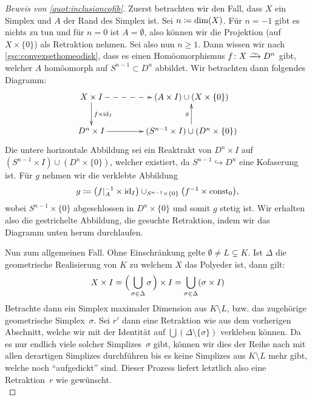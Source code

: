 \begin{proof}[Beweis von \cref{quot:inclusioncofib}]
    \pagebreak[2]
    Zuerst betrachten wir den Fall, dass $X$ ein Simplex und $A$ der Rand
    des Simplex ist. Sei $n\coloneqq\dim(X)$. Für $n=-1$ gibt es nichts zu tun und
    für $n=0$ ist $A=\emptyset$, also können wir die Projektion (auf
    $X\times\{0\}$) als Retraktion nehmen. Sei also nun $n\geq1$.
    Dann wissen wir nach \cref{gsc:convexsethomeodisk}, dass es
    einen Homöomorphismus 
    $f\colon X\xrightarrow{\smash{\raisebox{-2pt}{$\sim$}}} D^n$ 
    gibt, welcher $A$ homöomorph auf $S^{n-1}\subset D^n$ abbildet.
    Wir betrachten dann folgendes Diagramm:
    \begin{equation*}
        \begin{xy}
            \xymatrix@C=1.5cm{
                X\times I \ar@{-->}[r] \ar[d]^{f\times\id_I}
                & (A\times I)\cup(X\times\{0\})    
                \\
                D^n\times I \ar[r] 
                & (S^{n-1}\times I)\cup(D^n\times\{0\}) \ar[u]^g
            }
        \end{xy}
    \end{equation*}
    Die untere horizontale Abbildung sei ein Reaktrakt von $D^n\times I$ auf
    $(S^{n-1}\times I)\cup(D^n\times\{0\})$, welcher existiert, da
    $S^{n-1}\hookrightarrow D^n$ eine Kofaserung ist. Für $g$ nehmen wir die
    verklebte Abbildung 
    \[ g \coloneqq \bigl(f\vert_A^{-1} \times\operatorname{id}_I\bigr) \cup_{S^{n-1}\times\{0\}}
        \bigl( f^{-1}\times\operatorname{const}_0 \bigr)
    , \]
    wobei $S^{n-1}\times\{0\}$ abgeschlossen in $D^n\times\{0\}$ und somit $g$
    stetig ist. Wir erhalten also die gestrichelte Abbildung, die gesuchte
    Retraktion, indem wir das Diagramm unten herum durchlaufen.

    Nun zum allgemeinen Fall. Ohne Einschränkung gelte 
    $\emptyset\neq L \subsetneq K$. Ist $\Delta$ die geometrische Realisierung
    von $K$ zu welchem $X$ das Polyeder ist, dann gilt:
    \[ X \times I 
        = \Bigl(\, \bigcup_{\sigma\in\Delta} \sigma \mkern2mu\Bigr) \times I
        = \bigcup_{\sigma\in\Delta} (\sigma\times I)
    \]
    Betrachte dann ein Simplex maximaler Dimension aus $K\setminus L$, bzw. das
    zugehörige geometrische Simplex~$\sigma$. Sei $r'$ dann eine Retraktion wie
    aus dem vorherigen Abschnitt, welche wir mit der Identität auf $\bigcup
    (\Delta\setminus\{\sigma\})$ verkleben können. Da es nur endlich viele
    solcher Simplizes~$\sigma$ gibt, können wir dies der Reihe nach mit allen
    derartigen Simplizes durchführen bis es keine Simplizes aus $K\setminus L$
    mehr gibt, welche noch \enquote{aufgedickt} sind. Dieser Prozess liefert
    letztlich also eine Retraktion~$r$ wie gewünscht.
    \\
\end{proof}
